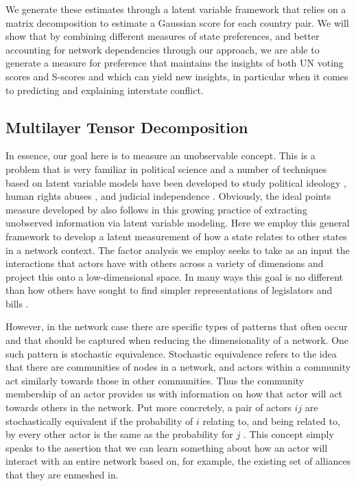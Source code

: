 We generate these estimates through a latent variable framework that relies on a matrix decomposition to estimate a Gaussian score for each country pair. We will show that by combining different measures of state preferences, and better accounting for network dependencies through our approach, we are able to generate a measure for preference that maintains the insights of both UN voting scores and S-scores and which can yield new insights, in particular when it comes to predicting and explaining interstate conflict.

\subsection*{Multilayer Tensor Decomposition}

In essence, our goal here is to measure an unobservable concept. This is a problem that is very familiar in political science and a number of techniques based on latent variable models have been developed to study political ideology \citep{martin:quinn:2002,konig:etal:2013}, human rights abuses \citep{fariss:2014}, and judicial independence \citep{linzer:staton:2015}. Obviously, the ideal points measure developed by \citet{bailey:etal:2015} also follows in this growing practice of extracting unobserved information via latent variable modeling. Here we employ this general framework to develop a latent measurement of how a state relates to other states in a network context. The factor analysis we employ seeks to take as an input the interactions that actors have with others across a variety of dimensions and project this onto a low-dimensional space. In many ways this goal is no different than how others have sought to find simpler representations of legislators and bills \citep{poole:rosenthal:1985,clinton:etal:2004}.

However, in the network case there are specific types of patterns that often occur and that should be captured when reducing the dimensionality of a network. One such pattern is stochastic equivalence. Stochastic equivalence refers to the idea that there are communities of nodes in a network, and actors within a community act similarly towards those in other communities. Thus the community membership of an actor provides us with information on how that actor will act towards others in the network. Put more concretely, a pair of actors $ij$ are stochastically equivalent if the probability of $i$ relating to, and being related to, by every other actor is the same as the probability for $j$ \citep{anderson:etal:1992}. This concept simply speaks to the assertion that we can learn something about how an actor will interact with an entire network based on, for example, the existing set of alliances that they are enmeshed in.

